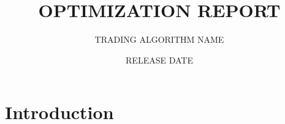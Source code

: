 \documentclass{article}
\title{OPTIMIZATION REPORT}
\author{TRADING ALGORITHM NAME}
\date{RELEASE DATE}
\begin{document}
\maketitle

\section{Introduction}
\end{document}

